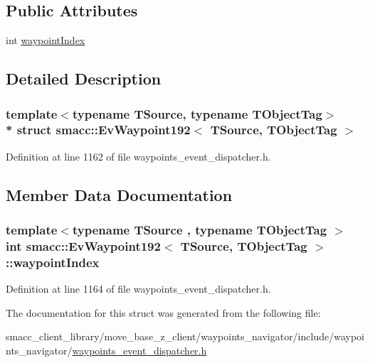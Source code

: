 \subsection*{Public Attributes}
\begin{DoxyCompactItemize}
\item 
int \hyperlink{structsmacc_1_1EvWaypoint192_a2756567c6397bb15364b97e669534165}{waypoint\+Index}
\end{DoxyCompactItemize}


\subsection{Detailed Description}
\subsubsection*{template$<$typename T\+Source, typename T\+Object\+Tag$>$\\*
struct smacc\+::\+Ev\+Waypoint192$<$ T\+Source, T\+Object\+Tag $>$}



Definition at line 1162 of file waypoints\+\_\+event\+\_\+dispatcher.\+h.



\subsection{Member Data Documentation}
\subsubsection[{\texorpdfstring{waypoint\+Index}{waypointIndex}}]{\setlength{\rightskip}{0pt plus 5cm}template$<$typename T\+Source , typename T\+Object\+Tag $>$ int {\bf smacc\+::\+Ev\+Waypoint192}$<$ T\+Source, T\+Object\+Tag $>$\+::waypoint\+Index}\hypertarget{structsmacc_1_1EvWaypoint192_a2756567c6397bb15364b97e669534165}{}\label{structsmacc_1_1EvWaypoint192_a2756567c6397bb15364b97e669534165}


Definition at line 1164 of file waypoints\+\_\+event\+\_\+dispatcher.\+h.



The documentation for this struct was generated from the following file\+:\begin{DoxyCompactItemize}
\item 
smacc\+\_\+client\+\_\+library/move\+\_\+base\+\_\+z\+\_\+client/waypoints\+\_\+navigator/include/waypoints\+\_\+navigator/\hyperlink{waypoints__event__dispatcher_8h}{waypoints\+\_\+event\+\_\+dispatcher.\+h}\end{DoxyCompactItemize}
